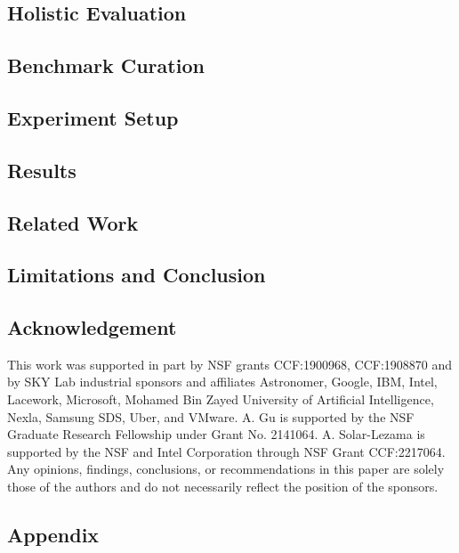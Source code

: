 \subsection{Holistic Evaluation}

\subsection{Benchmark Curation}

\subsection{Experiment Setup}

\subsection{Results}

\subsection{Related Work}

\subsection{Limitations and Conclusion}


\subsection*{Acknowledgement}
This work was supported in part by NSF grants CCF:1900968, CCF:1908870 and by SKY Lab industrial sponsors and affiliates Astronomer, Google, IBM, Intel, Lacework, Microsoft, Mohamed Bin Zayed University of Artificial Intelligence, Nexla, Samsung SDS, Uber, and VMware. A. Gu is supported by the NSF Graduate Research Fellowship under Grant No. 2141064. A. Solar-Lezama is supported by the NSF and Intel Corporation through NSF Grant CCF:2217064. Any opinions, findings, conclusions, or recommendations in this paper are solely those of the authors and do not necessarily reflect the position of the sponsors.
\subsection{Appendix}






